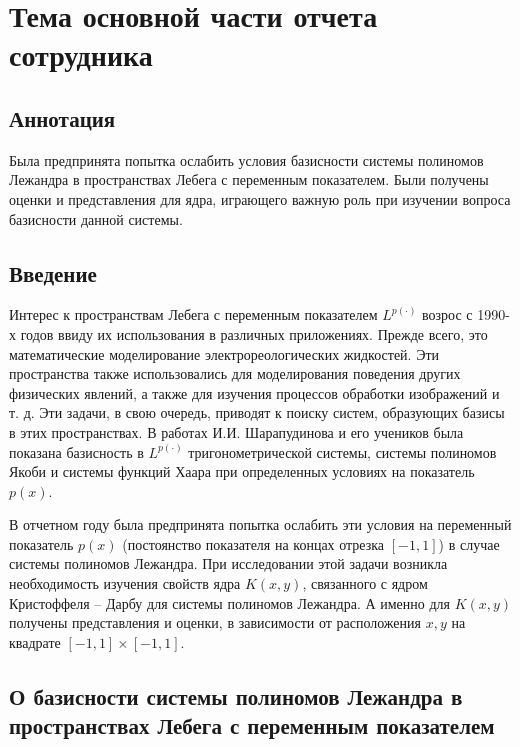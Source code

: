 \chapter{Тема основной части отчета сотрудника}


\section*{Аннотация}

Была предпринята попытка ослабить условия базисности системы полиномов Лежандра в пространствах Лебега с переменным показателем. Были получены оценки и представления для ядра, играющего важную роль при изучении вопроса базисности данной системы.


\section*{Введение}

Интерес к пространствам Лебега с переменным показателем $L^{p(\cdot)}$ возрос с 1990-х годов ввиду
их использования в различных приложениях. Прежде всего, это математические
моделирование электрореологических жидкостей. Эти пространства также использовались для моделирования поведения других физических явлений, а также для изучения процессов обработки изображений и т. д. Эти задачи, в свою очередь, приводят к поиску систем, образующих базисы в этих пространствах. В работах И.И. Шарапудинова и его учеников \cite{tad-SHII-Haar,tad-SHII-AnalisysMath,tad-SHII-Leg,tad-MMG-Haar,tad-SHII-Jacob,tad-SHII-Ult,tad-RAM-Jacob} была показана базисность в $L^{p(\cdot)}$  тригонометрической системы, системы полиномов Якоби и системы функций Хаара при определенных условиях на показатель $p(x)$.

В отчетном году была предпринята попытка ослабить эти условия на переменный показатель $p(x)$ (постоянство показателя на концах отрезка $[-1,1]$) в случае системы полиномов Лежандра. При исследовании этой задачи возникла необходимость изучения свойств ядра $K(x,y)$, связанного с ядром Кристоффеля -- Дарбу для системы полиномов Лежандра. А именно для $K(x,y)$ получены  представления и оценки, в зависимости от расположения $x,y$ на квадрате $[-1,1]\times[-1,1]$.


\section{О базисности системы полиномов Лежандра в пространствах Лебега с переменным показателем}

